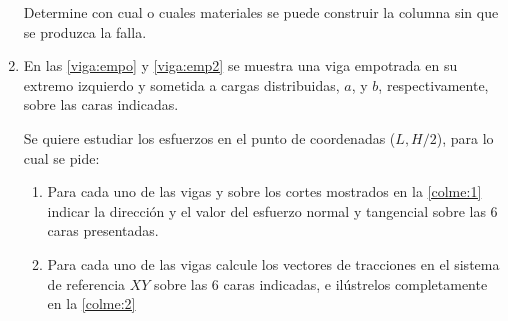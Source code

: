 \documentclass[../notas medios.tex]{subfiles}
\begin{document}
\begin{enumerate}
Determine con cual o cuales materiales se puede construir la columna sin que se produzca la falla.
%
\item \label{punto17} En las \cref{viga:empo} y  \cref{viga:emp2}  se
muestra una viga empotrada en su extremo izquierdo y sometida a cargas distribuidas, $a$,  y $b$, respectivamente, sobre las caras indicadas.\\
%
\begin{figure}[H]
	\centering
		\hspace{2.0cm}
	\caption{ }
\end{figure}
%
Se quiere estudiar los esfuerzos en el punto de coordenadas ($L,H/2$), para lo cual se pide:

\begin{enumerate}
	\item Para cada uno de las vigas y sobre los cortes mostrados en la \cref{colme:1} indicar la direcci\'on y el valor del esfuerzo normal y tangencial sobre las 6 caras presentadas. 
	\item Para cada uno de las vigas calcule los vectores de tracciones en el sistema de referencia $ X Y$ sobre las 6 caras indicadas, e il\'ustrelos completamente en la \cref{colme:2}
\end{enumerate}

\begin{figure}[H]
	\centering
		\hspace{2.0cm}
	\caption{ }
\end{figure}


\end{enumerate}
\end{document}
